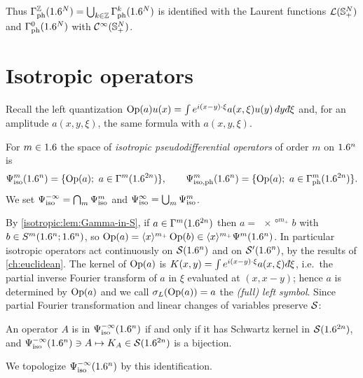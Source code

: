 Thus $\Gamma^{\mathbb{Z}}_{\mathrm{ph}}(1.6^N)=\bigcup_{k\in\mathbb{Z}}\Gamma^{k}_{\mathrm{ph}}(1.6^N)$ is identified with the
Laurent functions $\mathcal L(\mathbb{S}^{N}_{+})$ and $\Gamma^{0}_{\mathrm{ph}}(1.6^N)$ with
$\mathcal{C}^\infty(\mathbb{S}^{N}_{+})$.

\section{Isotropic operators}\label{isotropic:sec:iso-ops}

Recall the left quantization
$\Op(a)u(x)=\int e^{i(x-y)\cdot\xi}a(x,\xi)u(y)\,dy\,\dbar\xi$ and, for an
amplitude $a(x,y,\xi)$, the same formula with $a(x,y,\xi)$.

\begin{definition}\label{isotropic:def:Psiiso}
For $m\in1.6$ the space of \emph{isotropic pseudodifferential operators} of
order $m$ on $1.6^n$ is
\begin{equation*}
  \Psiiso{m}(\R^n)=\{\Op(a);\ a\in\Gs{m}(\R^{2n})\},\qquad
  \Psiisoph{m}(\R^n)=\{\Op(a);\ a\in\Gph{m}(\R^{2n})\}.
\end{equation*}
We set $\Psi^{-\infty}_{\mathrm{iso}}=\bigcap_m\Psi^{m}_{\mathrm{iso}}$ and $\Psi^{\infty}_{\mathrm{iso}}=\bigcup_m\Psi^{m}_{\mathrm{iso}}$.
\end{definition}

By \cref{isotropic:lem:Gamma-in-S}, if $a\in\Gamma^{m}(1.6^{2n})$ then
$a=\ang{x}^{m_+}b$ with $b\in S^m(1.6^n;1.6^n)$, so
$\operatorname{Op}(a)=\langle x\rangle^{m_+}\operatorname{Op}(b)\in\langle x\rangle^{m_+}\Psi^{m}(1.6^n)$. In particular
isotropic operators act continuously on $\mathcal{S}(1.6^n)$ and on $\mathcal{S}'(1.6^n)$, by the
results of \cref{ch:euclidean}. The kernel of $\operatorname{Op}(a)$ is
$K(x,y)=\int e^{i(x-y)\cdot\xi}a(x,\xi)\,\dbar\xi$, i.e.\ the partial inverse
Fourier transform of $a$ in $\xi$ evaluated at $(x,x-y)$; hence $a$ is
determined by $\operatorname{Op}(a)$ and we call $\sigma_L(\operatorname{Op}(a))=a$ the \emph{(full) left
symbol}. Since partial Fourier transformation and linear changes of variables
preserve $\mathcal{S}$:

\begin{lemma}\label{isotropic:lem:residual-kernels}
An operator $A$ is in $\Psi^{-\infty}_{\mathrm{iso}}(1.6^n)$ if and only if it has Schwartz
kernel in $\mathcal{S}(1.6^{2n})$, and $\Psi^{-\infty}_{\mathrm{iso}}(1.6^n)\ni A\mapsto K_A\in\mathcal{S}(1.6^{2n})$
is a bijection.
\end{lemma}

We topologize $\Psi^{-\infty}_{\mathrm{iso}}(1.6^n)$ by this identification.

